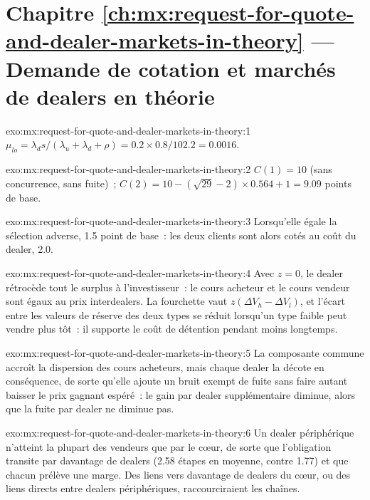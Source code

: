 \section*{Chapitre \ref{ch:mx:request-for-quote-and-dealer-markets-in-theory} --- Demande de cotation et marchés de dealers en théorie}

\begin{solution}{exo:mx:request-for-quote-and-dealer-markets-in-theory:1}
$\mu_{lo}=\lambda_ds/(\lambda_u+\lambda_d+\rho)=0.2\times0.8/102.2=0.0016$.
\end{solution}

\begin{solution}{exo:mx:request-for-quote-and-dealer-markets-in-theory:2}
$C(1)=10$ (sans concurrence, sans fuite)~; $C(2)=10-(\sqrt{29}-2)\times0.564+1=9.09$ points de base.
\end{solution}

\begin{solution}{exo:mx:request-for-quote-and-dealer-markets-in-theory:3}
Lorsqu'elle égale la sélection adverse, 1.5 point de base~: les deux clients sont alors cotés au coût du dealer, 2.0.
\end{solution}

\begin{solution}{exo:mx:request-for-quote-and-dealer-markets-in-theory:4}
Avec $z=0$, le dealer rétrocède tout le surplus à l'investisseur~: le cours acheteur et le cours vendeur sont égaux au prix interdealers. La fourchette vaut $z(\Delta V_h-\Delta V_l)$,
et l'écart entre les valeurs de réserve des deux types se réduit lorsqu'un type faible peut vendre plus tôt~: il supporte le coût de détention pendant moins longtemps.
\end{solution}

\begin{solution}{exo:mx:request-for-quote-and-dealer-markets-in-theory:5}
La composante commune accroît la dispersion des cours acheteurs, mais chaque dealer la décote en conséquence, de sorte qu'elle ajoute un bruit exempt de fuite
sans faire autant baisser le prix gagnant espéré~: le gain par dealer supplémentaire diminue, alors que la fuite par dealer ne diminue pas.
\end{solution}

\begin{solution}{exo:mx:request-for-quote-and-dealer-markets-in-theory:6}
Un dealer périphérique n'atteint la plupart des vendeurs que par le cœur, de sorte que l'obligation transite par davantage de dealers (2.58 étapes en moyenne, contre 1.77) et que chacun
prélève une marge. Des liens vers davantage de dealers du cœur, ou des liens directs entre dealers périphériques, raccourciraient les chaînes.
\end{solution}

